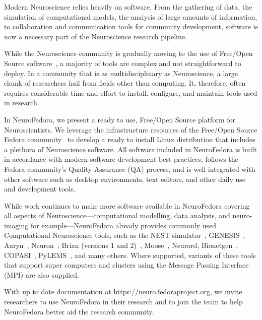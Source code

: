 
Modern Neuroscience relies heavily on software.
From the gathering of data, the simulation of computational models, the analysis of large amounts of information, to collaboration and communication tools for community development, software is now a necessary part of the Neuroscience research pipeline.

While the Neuroscience community is gradually moving to the use of Free/Open Source software~\cite{Stallman2002,Gleeson2017}, a majority of tools are complex and not straightforward to deploy.
In a community that is as multidisciplinary as Neuroscience, a large chunk of researchers hail from fields other than computing.
It, therefore, often requires considerable time and effort to install, configure, and maintain tools used in research.

In NeuroFedora, we present a ready to use, Free/Open Source platform for Neuroscientists.
We leverage the infrastructure resources of the Free/Open Source Fedora community~\cite{RedHat2008} to develop a ready to install Linux distribution that includes a plethora of Neuroscience software.
All software included in NeuroFedora is built in accordance with modern software development best practices, follows the Fedora community's Quality Assurance (QA) process, and is well integrated with other software such as desktop environments, text editors, and other daily use and development tools.

While work continues to make more software available in NeuroFedora covering all aspects of Neuroscience---computational modelling, data analysis, and neuro-imaging for example---NeuroFedora already provides commonly used Computational Neuroscience tools, such as the NEST simulator~\cite{Linssen2018}, GENESIS~\cite{Bower2003}, Auryn~\cite{Zenke2014}, Neuron~\cite{Hines1997}, Brian (versions 1 and 2)~\cite{Goodman2009}, Moose~\cite{Dudani2009}, Neurord, Bionetgen~\cite{Harris2016}, COPASI~\cite{Mendes2009}, PyLEMS~\cite{Vella2014}, and many others.
Where supported, variants of these tools that support super computers and clusters using the Message Passing Interface (MPI) are also supplied.

With up to date documentation at https://neuro.fedoraproject.org, we invite researchers to use NeuroFedora in their research and to join the team to help NeuroFedora better aid the research community.
